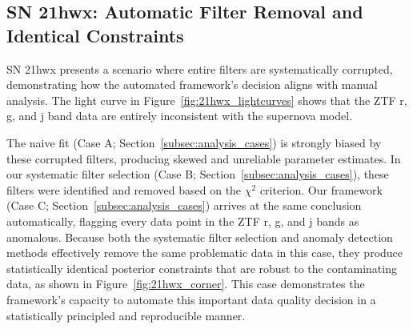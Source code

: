 \subsection{SN 21hwx: Automatic Filter Removal and Identical Constraints}
\label{subsec:sn21hwx}

SN 21hwx presents a scenario where entire filters are systematically corrupted, demonstrating how the automated framework's decision aligns with manual analysis. The light curve in Figure~\ref{fig:21hwx_lightcurves} shows that the ZTF r, g, and j band data are entirely inconsistent with the supernova model.

The naive fit (Case A; Section~\ref{subsec:analysis_cases}) is strongly biased by these corrupted filters, producing skewed and unreliable parameter estimates. In our systematic filter selection (Case B; Section~\ref{subsec:analysis_cases}), these filters were identified and removed based on the $\chi^2$ criterion. Our framework (Case C; Section~\ref{subsec:analysis_cases}) arrives at the same conclusion automatically, flagging every data point in the ZTF r, g, and j bands as anomalous. Because both the systematic filter selection and anomaly detection methods effectively remove the same problematic data in this case, they produce statistically identical posterior constraints that are robust to the contaminating data, as shown in Figure~\ref{fig:21hwx_corner}. This case demonstrates the framework's capacity to automate this important data quality decision in a statistically principled and reproducible manner.

